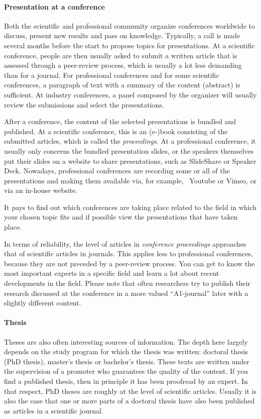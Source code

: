 \paragraph{Presentation at a conference}

Both the scientific and professional community organize conferences worldwide to discuss, present new results and pass on knowledge. Typically, a call is made several months before the start to propose topics for presentations. At a scientific conference, people are then usually asked to submit a written article that is assessed through a peer-review process, which is usually a lot less demanding than for a journal. For professional conferences and for some scientific conferences, a paragraph of text with a summary of the content (abstract) is sufficient. At industry conferences, a panel composed by the organizer will usually review the submissions and select the presentations.

After a conference, the content of the selected presentations is bundled and published. At a scientific conference, this is an (e-)book consisting of the submitted articles, which is called the \emph{proceedings}. At a professional conference, it usually only concerns the bundled presentation slides, or the speakers themselves put their slides on a website to share presentations, such as SlideShare or Speaker Deck. Nowadays, professional conferences are recording some or all of the presentations and making them available via, for example, ~Youtube or Vimeo, or via an in-house website.

It pays to find out which conferences are taking place related to the field in which your chosen topic fits and if possible view the presentations that have taken place.

In terms of reliability, the level of articles in \emph{conference proceedings} approaches that of scientific articles in journals. This applies less to professional conferences, because they are not preceded by a peer-review process. You can get to know the most important experts in a specific field and learn a lot about recent developments in the field. Please note that often researchers try to publish their research discussed at the conference in a more valued ``A1-journal'' later with a slightly different content.

\paragraph{Thesis}

Theses are also often interesting sources of information. The depth here largely depends on the study program for which the thesis was written: doctoral thesis (PhD thesis), master's thesis or bachelor's thesis. These texts are written under the supervision of a promoter who guarantees the quality of the content. If you find a published thesis, then in principle it has been proofread by an expert. In that respect, PhD theses are roughly at the level of scientific articles. Usually it is also the case that one or more parts of a doctoral thesis have also been published as articles in a scientific journal.

